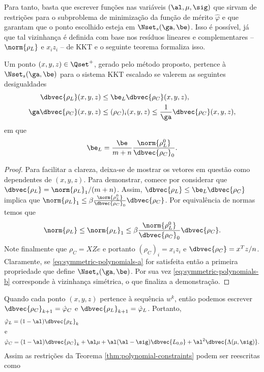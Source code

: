 Para tanto, basta que escrever funções nas variáveis
$(\al,\mu,\sig)$ que sirvam de restrições para o subproblema de minimização da
função de mérito $\hat{\varphi}$ e que garantam que o ponto escolhido esteja em 
$\Nset_{s}(\ga,\be)$. Isso é possível, já que tal vizinhança é definida com base
nos resíduos lineares e complementares -- $\norm{\rho_L}$ e $x_iz_i$ -- de
\ac{KKT} e o seguinte teorema formaliza isso.


\begin{teo} 
\label{thm:polynomial-constraints}
Um ponto $(x,y,z)\in\Qset^+$, gerado pelo método proposto, pertence à 
$\Nset_{s}(\ga,\be)$ para o sistema \ac{KKT} escalado se valerem as seguintes desigualdades 
\begin{subequations}
\label{eq:symmetric-polynomials}
\begin{align} 
 \dbvec{\rho_L}(x,y,z) & \leq \be_L \dbvec{\rho_C}(x,y,z),
 \label{eq:symmetric-polynomials-a}\\
 \ga\dbvec{\rho_C}(x,y,z) &\leq (\rho_C)_i(x,y,z) \leq
 \frac{1}{\ga}\dbvec{\rho_C}(x,y,z),
 \label{eq:symmetric-polynomials-b}
\end{align} 
\end{subequations}
em que \[\be_L = \frac{\be}{m+n}\frac{\norm{\rho_L^0}}{\dbvec{\rho_C}_0}.\]
\end{teo}



\begin{proof}Para facilitar a clareza, deixa-se de mostrar os vetores em
questão como dependentes de $(x,y,z)$. Para demonstrar, comece por
considerar que $\dbvec{\rho_L} = \norm{\rho_L}_1/(m+n)$.
Assim, $\dbvec{\rho_L}  \leq \be_L \dbvec{\rho_C}$ implica que 
$\norm{\rho_L}_1 \leq \beta \frac{\norm{\rho_L^0}}{\dbvec{\rho_C}_0}
\dbvec{\rho_C}$. 
Por equivalência de normas temos que 
\[
\norm{\rho_L} \leq \norm{\rho_L}_1 \leq \beta
\frac{\norm{\rho_L^0}}{\dbvec{\rho_C}_0} \dbvec{\rho_C}.
\] 
Note finalmente que $\rho_C = XZe$ e portanto $(\rho_C)_i = x_iz_i$ e
$\dbvec{\rho_C} = x^Tz/n$. Claramente, se  \eqref{eq:symmetric-polynomials-a}
for satisfeita então a primeira propriedade que define $\Nset_{s}(\ga,\be)$.
Por sua vez \eqref{eq:symmetric-polynomials-b} corresponde à vizinhança
simétrica, o que finaliza a demonstração.
\end{proof}



Quando cada ponto $(x,y,z)$ pertence à sequência $w^k$, então podemos escrever
$\dbvec{\rho_C}_{k+1} = \hat{\varphi}_C$ e $\dbvec{\rho_L}_{k+1} =
\hat{\varphi}_L$. Portanto,
\begin{align*}
 &\hat{\varphi}_L = (1-\al)\dbvec{\rho_L}_k\\
 \intertext{e}
  &\hat{\varphi}_C =  (1-\al)\dbvec{\rho_C}_k+ \al\mu +
\al(\al-\sig)\dbvec{L_{0,0}} + \al^2\dbvec{\Lambda(\mu,\sig)}.
\end{align*}
Assim as restrições da Teorema \ref{thm:polynomial-constraints} podem ser
reescritas como

